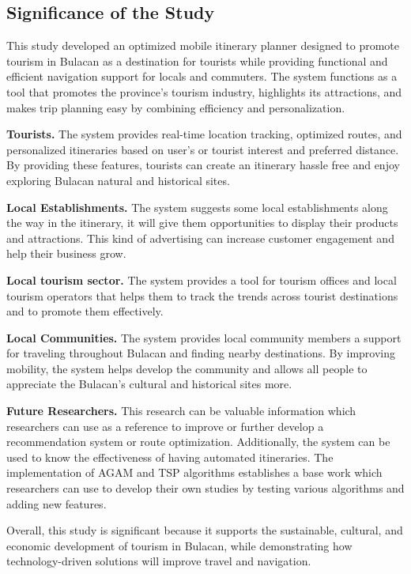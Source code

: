 \subsection{Significance of the Study}

This study developed an optimized mobile itinerary planner designed to promote tourism in Bulacan as a destination for tourists while providing functional and efficient navigation support for locals and commuters. The system functions as a tool that promotes the province’s tourism industry, highlights its attractions, and makes trip planning easy by combining efficiency and personalization.

\textbf{Tourists.} The system provides real-time location tracking, optimized routes, and personalized itineraries based on user’s or tourist interest and preferred distance. By providing these features, tourists can create an itinerary hassle free and enjoy exploring Bulacan natural and historical sites.

\textbf{Local Establishments.} The system suggests some local establishments along the way in the itinerary, it will give them opportunities to display their products and attractions. This kind of advertising can increase customer engagement and help their business grow.

\textbf{Local tourism sector.} The system provides a tool for  tourism offices and local tourism operators that helps them to track the trends across tourist destinations and to promote them effectively.

\textbf{Local Communities.} The system provides local community members a support  for traveling throughout Bulacan and finding nearby destinations. By improving mobility, the system helps develop the community and allows all people to appreciate the Bulacan’s cultural and historical sites more.

\textbf{Future Researchers.} This research can be valuable information which researchers can use as a reference to improve or further develop a recommendation system or route optimization. Additionally, the system can be used  to know the effectiveness of having automated itineraries. The implementation of AGAM and TSP algorithms establishes a base work which researchers can use to develop their own studies by testing various algorithms and adding new features.

Overall, this study is significant because it supports the sustainable, cultural, and economic development of tourism in Bulacan, while demonstrating how technology-driven solutions will improve travel and navigation.

